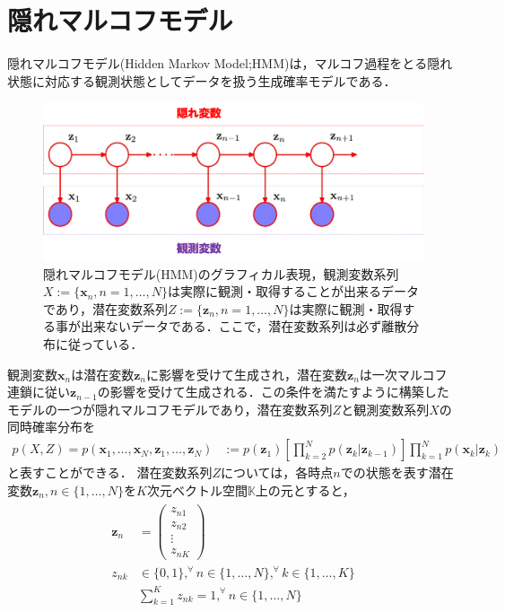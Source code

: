 \documentclass[dvipdfmx,autodetect-engine]{jsreport}
\begin{document}
\section{隠れマルコフモデル}

隠れマルコフモデル(Hidden Markov Model;HMM)は，マルコフ過程をとる隠れ状態に対応する観測状態としてデータを扱う生成確率モデルである\cite{元田_栗田_樋口_松本_村田201202}．
\begin{figure}[h]
\centering
\includegraphics[scale=0.5]{Picture2.png}
\caption{\label{fig:2.1}
隠れマルコフモデル(HMM)のグラフィカル表現\cite{Bishop201002}，観測変数系列$X:=\{\bm{x}_n,n=1,\dots,N\}$は実際に観測・取得することが出来るデータであり，潜在変数系列$Z:=\{\bm{z}_n,n=1,\dots,N\}$は実際に観測・取得する事が出来ないデータである．ここで，潜在変数系列は必ず離散分布に従っている．}
\end{figure}
観測変数$\bm{x}_n$は潜在変数$\bm{z}_n$に影響を受けて生成され，潜在変数$\bm{z}_n$は一次マルコフ連鎖に従い$\bm{z}_{n-1}$の影響を受けて生成される．この条件を満たすように構築したモデルの一つが隠れマルコフモデルであり，潜在変数系列$Z$と観測変数系列$X$の同時確率分布を
\begin{align*}
	p(X,Z) = p(\bm{x}_1,\dots,\bm{x}_N,\bm{z}_1,\dots,\bm{z}_N) &:= p(\bm{z}_1) \left[ \prod_{k=2}^N p(\bm{z}_k|\bm{z}_{k-1})\right] \prod_{k=1}^N p(\bm{x}_k|\bm{z}_k)
	\label{eq:HMM}
\end{align*}
と表すことができる．
潜在変数系列$Z$については，各時点$n$での状態を表す潜在変数$\bm{z}_n,n \in \{1,\dots,N\}$を$K$次元ベクトル空間$\mathbb{K}$上の元とすると，
\begin{align}
    \begin{aligned}
    	\bm{z}_n &= 
	    \begin{pmatrix}
		    z_{n1} \\
		    z_{n2} \\
		    \vdots \\
		    z_{nK}
	    \end{pmatrix} \\
        z_{nk} &\in \{ 0,1 \}, ^\forall n \in \{1,\dots,N\}, ^\forall k \in \{1,\dots,K\} \\
	    & \sum_{k=1}^{K} z_{nk} = 1, ^\forall n \in \{1,\dots,N\}
    \end{aligned}
\end{align}
\end{document}
